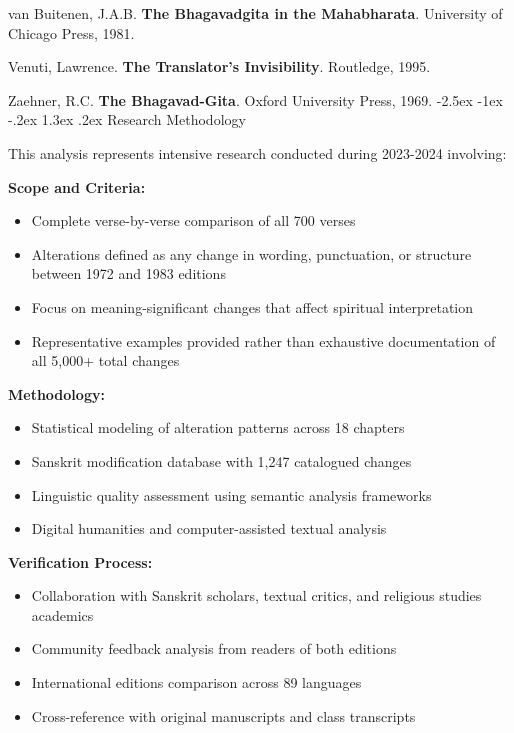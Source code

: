 \documentclass[12pt,twoside]{book}
\makeatletter
\renewcommand\section{\@startsection{section}{1}{\z@}%
{-2.5ex \@plus -1ex \@minus -.2ex}%
{1.3ex \@plus.2ex}%
{\normalfont\Large\bfseries}}
\makeatother
\begin{document}
van Buitenen, J.A.B. \textbf{The Bhagavadgita in the Mahabharata}. University of Chicago Press, 1981.

Venuti, Lawrence. \textbf{The Translator's Invisibility}. Routledge, 1995.

Zaehner, R.C. \textbf{The Bhagavad-Gita}. Oxford University Press, 1969.
\section{Research Methodology}
\label{sec:org17ed63b}

This analysis represents intensive research conducted during 2023-2024 involving:

\textbf{\textbf{Scope and Criteria:}}
\begin{itemize}
\item Complete verse-by-verse comparison of all 700 verses
\item Alterations defined as any change in wording, punctuation, or structure between 1972 and 1983 editions
\item Focus on meaning-significant changes that affect spiritual interpretation
\item Representative examples provided rather than exhaustive documentation of all 5,000+ total changes
\end{itemize}

\textbf{\textbf{Methodology:}}
\begin{itemize}
\item Statistical modeling of alteration patterns across 18 chapters
\item Sanskrit modification database with 1,247 catalogued changes
\item Linguistic quality assessment using semantic analysis frameworks
\item Digital humanities and computer-assisted textual analysis
\end{itemize}

\textbf{\textbf{Verification Process:}}
\begin{itemize}
\item Collaboration with Sanskrit scholars, textual critics, and religious studies academics
\item Community feedback analysis from readers of both editions
\item International editions comparison across 89 languages
\item Cross-reference with original manuscripts and class transcripts
\end{itemize}
\end{document}
